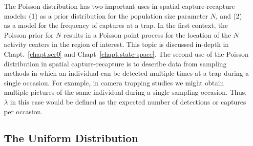 The Poisson distribution has two important uses in spatial
capture-recapture models: (1) as a prior distribution for the
population size parameter $N$, and (2) as a model for the frequency of
captures at a trap. In the first context, the Poisson prior for $N$
results in a Poisson point process for the location of the $N$
activity centers in the region of interest. This topic is discussed
in-depth in Chapt.~\ref{chapt.scr0} and Chapt~\ref{chapt.state-space}.
The second use of the Poisson distribution in spatial capture-recapture is
to describe data from sampling methods in which an
individual can be detected multiple times at a trap during a single
occasion. For example, in camera trapping studies we might obtain
multiple pictures of the same individual during a single sampling
occasion. Thus, $\lambda$ in this case would be defined as the
expected number of detections or captures per occasion.


\subsection{The Uniform Distribution}

